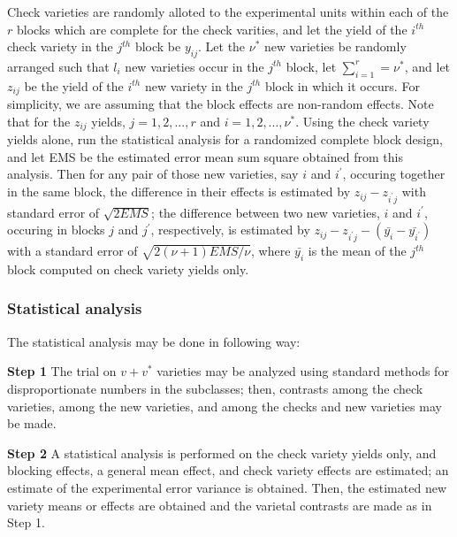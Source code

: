 \documentclass[12pt,oneside]{dukestatscithesis} %
\theoremstyle{definition}
\theoremstyle{definition}
\theoremstyle{definition}
\theoremstyle{remark}
\begin{document}
Check varieties are randomly alloted to the experimental units within
each of the \(r\) blocks which are complete for the check varities, and
let the yield of the \(i^{th}\) check variety in the \(j^{th}\) block be
\(y_{ij}\). Let the \(\nu^*\) new varieties be randomly arranged such
that \(l_{i}\) new varieties occur in the \(j^{th}\) block, let
\(\sum\limits_{i = 1}^r = \nu^*\), and let \(z_{ij}\) be the yield of
the \(i^{th}\) new variety in the \(j^{th}\) block in which it occurs.
For simplicity, we are assuming that the block effects are non-random
effects. Note that for the \(z_{ij}\) yields, \(j = 1, 2, ..., r\) and
\(i = 1, 2,..., \nu^*\). Using the check variety yields alone, run the
statistical analysis for a randomized complete block design, and let EMS
be the estimated error mean sum square obtained from this analysis. Then
for any pair of those new varieties, say \(i\) and \(i^{\prime}\),
occuring together in the same block, the difference in their effects is
estimated by \(z_{ij}- z_{i^{\prime}j}\) with standard error of
\(\sqrt{2EMS}\); the difference between two new varieties, \(i\) and
\(i^\prime\), occuring in blocks \(j\) and \(j^\prime\), respectively,
is estimated by
\(z_{ij}-z_{i^{\prime}j}-(\bar{y_{i}}-\bar{y_{i^{\prime}}})\) with a
standard error of \(\sqrt{2(\nu + 1)EMS/\nu}\), where \(\bar{y_{i}}\) is
the mean of the \(j^{th}\) block computed on check variety yields only.

\subsubsection{Statistical analysis}\label{stat-an-aug-block}

The statistical analysis may be done in following way:

\textbf{Step 1} \newline The trial on \(v + v^*\) varieties may be
analyzed using standard methods for disproportionate numbers in the
subclasses; then, contrasts among the check varieties, among the new
varieties, and among the checks and new varieties may be made.

\textbf{Step 2} \newline A statistical analysis is performed on the
check variety yields only, and blocking effects, a general mean effect,
and check variety effects are estimated; an estimate of the experimental
error variance is obtained. Then, the estimated new variety means or
effects are obtained and the varietal contrasts are made as in Step 1.
\end{document}
